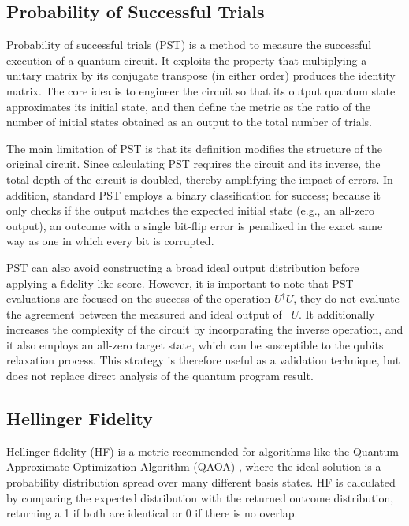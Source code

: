 \documentclass[10pt,conference]{IEEEtran}
\begin{document}
\subsection{Probability of Successful Trials}

Probability of successful trials (PST) \cite{mohapatraBenchmarkingFidelityMetrics_2025} is a method to measure the successful execution of a quantum circuit. It exploits the property that multiplying a unitary matrix by its conjugate transpose (in either order) produces the identity matrix. The core idea is to engineer the circuit so that its output quantum state approximates its initial state, and then define the metric as the ratio of the number of initial states obtained as an output to the total number of trials.

The main limitation of PST is that its definition modifies the structure of the original circuit. Since calculating PST requires the circuit and its inverse, the total depth of the circuit is doubled, thereby amplifying the impact of errors. In addition, standard PST employs a binary classification for success; because it only checks if the output matches the expected initial state (e.g., an all-zero output), an outcome with a single bit-flip error is penalized in the exact same way as one in which every bit is corrupted.

PST can also avoid constructing a broad ideal output distribution before applying a fidelity-like score. However, it is important to note that PST evaluations are focused on the success of the operation $U^{\dagger}U$, they do not evaluate the agreement between the measured and ideal output of ~$U$. It additionally increases the complexity of the circuit by incorporating the inverse operation, and it also employs an all-zero target state, which can be susceptible to the qubits relaxation process. This strategy is therefore useful as a validation technique, but does not replace direct analysis of the quantum program result.

\subsection{Hellinger Fidelity}

Hellinger fidelity (HF) is a metric recommended for algorithms like the Quantum Approximate Optimization Algorithm (QAOA) \cite{zhouQuantumApproximateOptimization_2020}, where the ideal solution is a probability distribution spread over many different basis states. HF is calculated by comparing the expected distribution with the returned outcome distribution, returning a 1 if both are identical or 0 if there is no overlap.
\end{document}
